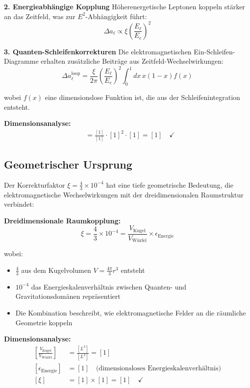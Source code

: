 \documentclass[12pt,a4paper]{report}
\begin{document}
	\textbf{2. Energieabhängige Kopplung}
	Höherenergetische Leptonen koppeln stärker an das Zeitfeld, was zur $E^2$-Abhängigkeit führt:
	\begin{equation}
		\Delta a_\ell \propto \xi \left(\frac{E_\ell}{E_e}\right)^2
	\end{equation}
	
	\textbf{3. Quanten-Schleifenkorrekturen}
	Die elektromagnetischen Ein-Schleifen-Diagramme erhalten zusätzliche Beiträge aus Zeitfeld-Wechselwirkungen:
	\begin{equation}
		\Delta a_\ell^{\text{loop}} = \frac{\xi}{2\pi} \left(\frac{E_\ell}{E_e}\right)^2 \int_0^1 dx \, x(1-x) f(x)
	\end{equation}
	
	wobei $f(x)$ eine dimensionslose Funktion ist, die aus der Schleifenintegration entsteht.
	
	\textbf{Dimensionsanalyse:}
	\begin{align}
		[\Delta a_\ell^{\text{loop}}] &= \frac{[1]}{[1]} \cdot [1]^2 \cdot [1] = [1] \quad \checkmark
	\end{align}
	
	\subsection{Geometrischer Ursprung}
	\label{subsec:geometric_origin}
	
	Der Korrekturfaktor $\xi = \frac{4}{3} \times 10^{-4}$ hat eine tiefe geometrische Bedeutung, die elektromagnetische Wechselwirkungen mit der dreidimensionalen Raumstruktur verbindet:
	
	\textbf{Dreidimensionale Raumkopplung:}
	\begin{equation}
		\xi = \frac{4}{3} \times 10^{-4} = \frac{V_{\text{Kugel}}}{V_{\text{Würfel}}} \times \epsilon_{\text{Energie}}
	\end{equation}
	
	wobei:
	\begin{itemize}
		\item $\frac{4}{3}$ aus dem Kugelvolumen $V = \frac{4\pi}{3}r^3$ entsteht
		\item $10^{-4}$ das Energieskalenverhältnis zwischen Quanten- und Gravitationsdomänen repräsentiert
		\item Die Kombination beschreibt, wie elektromagnetische Felder an die räumliche Geometrie koppeln
	\end{itemize}
	
	\textbf{Dimensionsanalyse:}
	\begin{align}
		\left[\frac{V_{\text{Kugel}}}{V_{\text{Würfel}}}\right] &= \frac{[L^3]}{[L^3]} = [1] \\
		[\epsilon_{\text{Energie}}] &= [1] \quad \text{(dimensionsloses Energieskalenverhältnis)} \\
		[\xi] &= [1] \times [1] = [1] \quad \checkmark
	\end{align}
	
\end{document}

